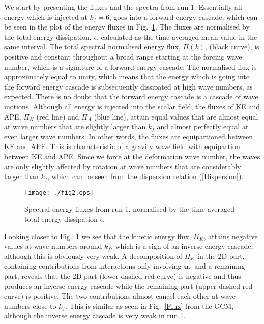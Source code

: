 { We start by presenting the fluxes and the spectra from run 1. }Essentially all energy which is injected at $ k_f  =6 $, goes into a forward energy cascade, which can be seen in the plot of the energy fluxes in Fig.~\ref{F1}. The fluxes are normalised by the total energy dissipation, $ \epsilon $, calculated as the time averaged mean value in the same interval.  The total spectral normalised energy flux, $ \Pi(k) $, (black curve), is positive and constant throughout a broad range starting at the forcing wave number,  which is a signature of a forward energy cascade. The normalised flux is approximately equal to unity, which means that the energy which is going into the forward energy cascade is subsequently dissipated at high wave numbers, as expected. There is no doubt that the forward energy cascade is a cascade of wave motions. Although all energy is injected into the scalar field, the fluxes of KE and APE, $ \Pi_K $ (red line) and $ \Pi_A $ (blue line), attain equal values that are almost equal at wave numbers that are slightly larger than $ k_f $ and almost perfectly equal at even larger wave numbers.  In other words, the fluxes are equipartioned between KE and APE. This is characteristic of a gravity wave field with equipartion between KE and APE.
Since we force at the deformation wave number, the waves are only slightly affected by rotation at wave numbers that are considerably larger than $ k_f $, which can be seen from the dispersion relation (\ref{Dispersion}).

\begin{figure}[h]
\centerline{\texttt{[image: ./fig2.eps]}}
 \caption{Spectral energy fluxes from run 1, normalised by the time averaged total energy dissipation $ \epsilon $.  }
 \label{F1}
 \end{figure}

Looking closer to Fig.~\ref{F1} we see that the kinetic energy flux, $ \Pi_K $, attains negative values at wave numbers around $ k_f $, which is a sign of an inverse energy cascade, although this is obviously very weak. A decomposition of  $ \Pi_K $ in the 2D part, containing contributions from interactions only involving $ {\bf u}_r $ and a remaining part, reveals that the 2D part (lower dashed red curve) is negative and thus produces an inverse energy cascade  while the remaining part (upper dashed red curve) is positive. The two contributions almost cancel each other at wave numbers close to $ k_f $. This is similar as seen in Fig.~\ref{Flux} from the GCM, although the inverse energy cascade is very weak in run 1.

